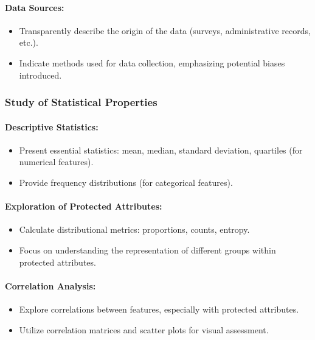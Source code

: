 \paragraph{Data Sources:}
\begin{itemize}
    \item Transparently describe the origin of the data (surveys, administrative records, etc.).
    \item Indicate methods used for data collection, emphasizing potential biases introduced.
\end{itemize}

\subsubsection{Study of Statistical Properties}

\paragraph{Descriptive Statistics:}
\begin{itemize}
    \item Present essential statistics: mean, median, standard deviation, quartiles (for numerical features).
    \item Provide frequency distributions (for categorical features).
\end{itemize}

\paragraph{Exploration of Protected Attributes:}
\begin{itemize}
    \item Calculate distributional metrics: proportions, counts, entropy.
    \item Focus on understanding the representation of different groups within protected attributes.
\end{itemize}

\paragraph{Correlation Analysis:}
\begin{itemize}
    \item Explore correlations between features, especially with protected attributes.
    \item Utilize correlation matrices and scatter plots for visual assessment.
\end{itemize}


